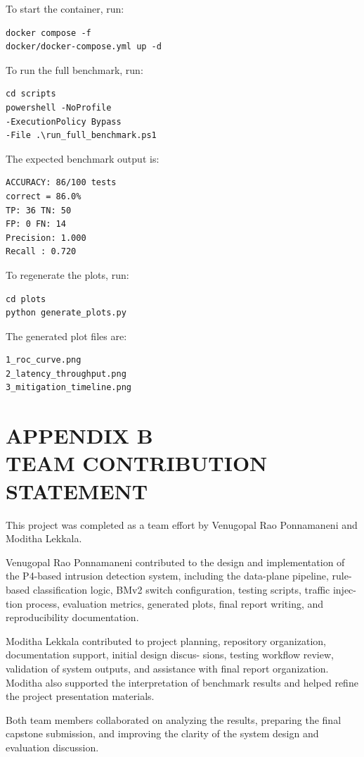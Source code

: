 \documentclass[conference]{IEEEtran}
\begin{document}
To start the container, run:

\begin{verbatim}
docker compose -f
docker/docker-compose.yml up -d
\end{verbatim}

To run the full benchmark, run:

\begin{verbatim}
cd scripts
powershell -NoProfile
-ExecutionPolicy Bypass
-File .\run_full_benchmark.ps1
\end{verbatim}

The expected benchmark output is:

\begin{verbatim}
ACCURACY: 86/100 tests
correct = 86.0%
TP: 36 TN: 50
FP: 0 FN: 14
Precision: 1.000
Recall : 0.720
\end{verbatim}

To regenerate the plots, run:

\begin{verbatim}
cd plots
python generate_plots.py
\end{verbatim}

The generated plot files are:

\begin{verbatim}
1_roc_curve.png
2_latency_throughput.png
3_mitigation_timeline.png
\end{verbatim}

\clearpage

\section*{APPENDIX B\\TEAM CONTRIBUTION STATEMENT}

This project was completed as a team effort by Venugopal
Rao Ponnamaneni and Moditha Lekkala.

Venugopal Rao Ponnamaneni contributed to the design and
implementation of the P4-based intrusion detection system,
including the data-plane pipeline, rule-based classification
logic, BMv2 switch configuration, testing scripts, traffic injec-
tion process, evaluation metrics, generated plots, final report
writing, and reproducibility documentation.

\vspace{0.2cm}

Moditha Lekkala contributed to project planning, repository
organization, documentation support, initial design discus-
sions, testing workflow review, validation of system outputs,
and assistance with final report organization. Moditha also
supported the interpretation of benchmark results and helped
refine the project presentation materials.

\vspace{0.2cm}

Both team members collaborated on analyzing the results,
preparing the final capstone submission, and improving the
clarity of the system design and evaluation discussion.
\end{document}
